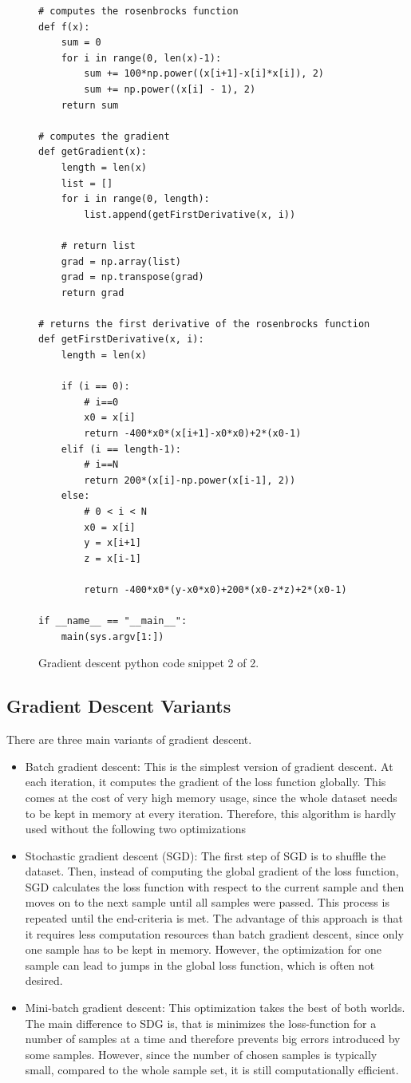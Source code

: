 \documentclass[accentcolor=tud9c]{tudexercise}
\begin{document}
	
	\begin{figure} [h]
	\begin{lstlisting}
# computes the rosenbrocks function
def f(x):
	sum = 0
	for i in range(0, len(x)-1):
		sum += 100*np.power((x[i+1]-x[i]*x[i]), 2)
		sum += np.power((x[i] - 1), 2)
	return sum

# computes the gradient
def getGradient(x):
	length = len(x)
	list = []
	for i in range(0, length):
		list.append(getFirstDerivative(x, i))
	
	# return list
	grad = np.array(list)
	grad = np.transpose(grad)
	return grad
	
# returns the first derivative of the rosenbrocks function
def getFirstDerivative(x, i):
	length = len(x)
	
	if (i == 0):
		# i==0
		x0 = x[i]
		return -400*x0*(x[i+1]-x0*x0)+2*(x0-1)
	elif (i == length-1):
		# i==N
		return 200*(x[i]-np.power(x[i-1], 2))
	else:
		# 0 < i < N
		x0 = x[i]
		y = x[i+1]
		z = x[i-1]

		return -400*x0*(y-x0*x0)+200*(x0-z*z)+2*(x0-1)

if __name__ == "__main__":
	main(sys.argv[1:])	
	\end{lstlisting}
	\caption{Gradient descent python code snippet 2 of 2.}
	\label{code:python2}
	\end{figure}
	
	\subsection{Gradient Descent Variants}
	There are three main variants of gradient descent.
	\begin{itemize}
		\item 	Batch gradient descent: This is the simplest version of gradient descent. At each iteration, it computes the gradient of the loss function globally. This comes at the cost of very high memory usage, since the whole dataset needs to be kept in memory at every iteration. Therefore, this algorithm is hardly used without the following two optimizations
		\item Stochastic gradient descent (SGD): The first step of SGD is to shuffle the dataset. Then, instead of computing the global gradient of the loss function, SGD calculates the loss function with respect to the current sample and then moves on to the next sample until all samples were passed. This process is repeated until the end-criteria is met. The advantage of this approach is that it requires less computation resources than batch gradient descent, since only one sample has to be kept in memory. However, the optimization for one sample can lead to jumps in the global loss function, which is often not desired.
		\item Mini-batch gradient descent: This optimization takes the best of both worlds. The main difference to SDG is, that is minimizes the loss-function for a number of samples at a time and therefore prevents big errors introduced by some samples. However, since the number of chosen samples is typically small, compared to the whole sample set, it is still computationally efficient.
	\end{itemize}
\end{document}
